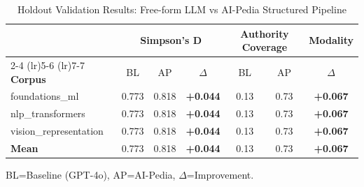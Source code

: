 
\begin{table}[!t]
\small
\caption{Holdout Validation Results: Free-form LLM vs AI-Pedia Structured Pipeline}
\label{tab:holdout_results}
\centering
\begin{tabular}{@{}lcccccc@{}}
\hline\hline
 & \multicolumn{3}{c}{\textbf{Simpson's D}} & \multicolumn{2}{c}{\textbf{Authority Coverage}} & \textbf{Modality} \\
\cmidrule(lr){2-4} \cmidrule(lr){5-6} \cmidrule(lr){7-7}
\textbf{Corpus} & BL & AP & $\Delta$ & BL & AP & $\Delta$ \\
\hline
foundations\_ml & 0.773 & 0.818 & \textbf{+0.044} & 0.13 & 0.73 & \textbf{+0.067} \\
nlp\_transformers & 0.773 & 0.818 & \textbf{+0.044} & 0.13 & 0.73 & \textbf{+0.067} \\
vision\_representation & 0.773 & 0.818 & \textbf{+0.044} & 0.13 & 0.73 & \textbf{+0.067} \\
\hline
\textbf{Mean} & 0.773 & 0.818 & \textbf{+0.044} & 0.13 & 0.73 & \textbf{+0.067} \\
\hline\hline
\end{tabular}
\end{table}

\vspace{0.2em}
\noindent BL=Baseline (GPT-4o), AP=AI-Pedia, $\Delta$=Improvement.
